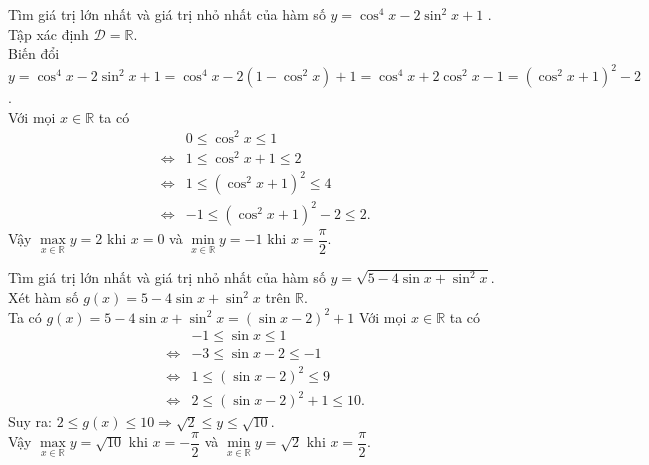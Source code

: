 \begin{bt}%
	Tìm giá trị lớn nhất và giá trị nhỏ nhất của hàm số $y=\cos ^{4} x-2 \sin ^{2} x+1$ .
	\loigiai
	{
		Tập xác định $\mathscr{D}=\mathbb{R}$.\\
		Biến đổi $y=\cos ^{4} x-2 \sin ^{2} x+1=\cos ^{4} x-2 \left(1-\cos^2 x\right)+1=\cos ^{4} x+2 \cos ^{2} x-1=\left(\cos^2 x+1\right)^2-2 $.\\
		Với mọi $x\in \mathbb{R}$ ta có
		\allowdisplaybreaks
		\begin{eqnarray*}
			& & 0\leq \cos^2 x\leq 1\\
			&\Leftrightarrow& 1\leq \cos^2 x+1\leq 2\\
			&\Leftrightarrow&1\leq \left( \cos^2 x+1\right)^2\leq 4\\
			&\Leftrightarrow&-1\leq \left( \cos^2 x+1\right)^2-2\leq 2.
		\end{eqnarray*}
		Vậy $\max\limits_{x \in \mathbb{R}} y=2$ khi $x=0$ và $\min\limits_{x \in \mathbb{R}} y=-1$ khi $x=\dfrac{\pi}{2}$.
	}
\end{bt}

\begin{bt}%
	Tìm giá trị lớn nhất và giá trị nhỏ nhất của hàm số  $y=\sqrt{5-4 \sin x+\sin ^{2} x}$.
	\loigiai
	{Xét hàm số $g(x)=5-4 \sin x+\sin ^{2} x$ trên $\mathbb{R}$.\\
		Ta có $g(x)=5-4 \sin x+\sin ^{2} x=\left(\sin x -2\right)^2+1$
		Với mọi $x\in \mathbb{R}$ ta có
		\allowdisplaybreaks
		\begin{eqnarray*}
			& & -1\leq \sin  x\leq 1\\
			&\Leftrightarrow&-3\leq \sin x-2\leq -1\\
			&\Leftrightarrow&1\leq \left( \sin x-2\right)^2\leq 9\\
			&\Leftrightarrow&2\leq  \left( \sin x-2\right)^2+1\leq 10.
		\end{eqnarray*}
		Suy ra: $2\leq g(x)\leq 10 \Rightarrow \sqrt{2}\leq y\leq \sqrt{10}$.\\
		Vậy $\max\limits_{x \in \mathbb{R}} y=\sqrt{10}$ khi $x=-\dfrac{\pi}{2}$ và $\min\limits_{x \in \mathbb{R}} y=\sqrt{2}$ khi $x=\dfrac{\pi}{2}$.
	}
\end{bt}

